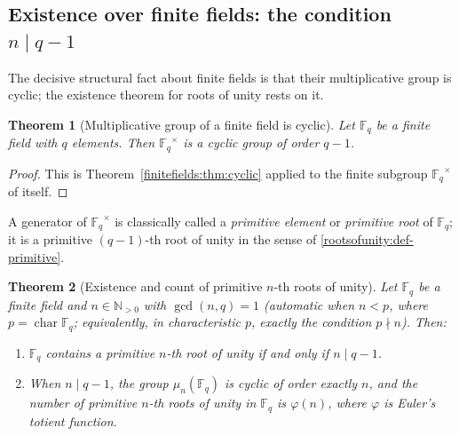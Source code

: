 \documentclass[11pt,a4paper]{article}
\newtheorem{theorem}{Theorem}[section]
\theoremstyle{definition}
\theoremstyle{remark}
\newcommand{\N}{\ensuremath{\mathbb{N}}}
\newcommand{\Fq}{\ensuremath{\mathbb{F}_{q}}}
\begin{document}
\subsection{Existence over finite fields: the condition \(n \mid q-1\)}

The decisive structural fact about finite fields is that their multiplicative group is cyclic; the existence theorem for roots of unity rests on it.

\begin{theorem}[Multiplicative group of a finite field is cyclic]\label{rootsofunity:thm-cyclic}
Let \(\Fq\) be a finite field with \(q\) elements. Then \(\Fq^\times\) is a cyclic group of order \(q-1\).
\end{theorem}

\begin{proof}
This is Theorem~\ref{finitefields:thm:cyclic} applied to the finite subgroup \(\Fq^\times\) of itself.
\end{proof}

A generator of \(\Fq^\times\) is classically called a \emph{primitive element} or \emph{primitive root} of \(\Fq\); it is a primitive \((q-1)\)-th root of unity in the sense of \cref{rootsofunity:def-primitive}.

\begin{theorem}[Existence and count of primitive \(n\)-th roots of unity]\label{rootsofunity:thm-existence}
Let \(\Fq\) be a finite field and \(n \in \N_{>0}\) with \(\gcd(n, q) = 1\) (automatic when \(n < p\), where \(p = \operatorname{char}\Fq\); equivalently, in characteristic \(p\), exactly the condition \(p \nmid n\)). Then:
\begin{enumerate}
\item \(\Fq\) contains a primitive \(n\)-th root of unity if and only if \(n \mid q - 1\).
\item When \(n \mid q-1\), the group \(\mu_n(\Fq)\) is cyclic of order exactly \(n\), and the number of primitive \(n\)-th roots of unity in \(\Fq\) is \(\varphi(n)\), where \(\varphi\) is Euler's totient function.
\end{enumerate}
\end{theorem}
\end{document}
